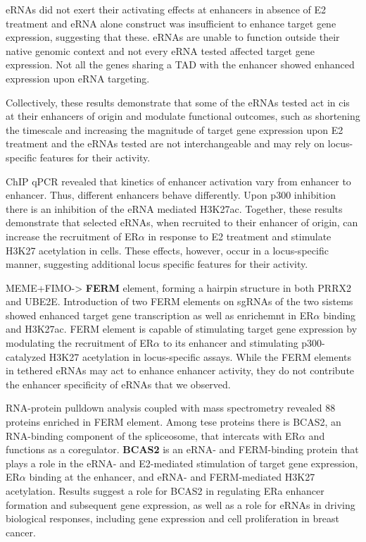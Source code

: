 eRNAs did not exert their activating effects at enhancers in absence of E2 treatment and eRNA alone construct was insufficient to enhance target gene expression, suggesting that these.
eRNAs are unable to function outside their native genomic context and not every eRNA tested affected target gene expression.
Not all the genes sharing a TAD with the enhancer showed enhanced expression upon eRNA
targeting.

Collectively, these results demonstrate that some of the eRNAs tested act in cis at their enhancers of origin and
modulate functional outcomes, such as shortening the timescale
and increasing the magnitude of target gene expression upon E2
treatment and the eRNAs tested are not interchangeable and may rely on locus-
specific features for their activity.

ChIP qPCR revealed that kinetics of enhancer
activation vary from enhancer to
enhancer. Thus, different enhancers
behave differently. Upon p300 inhibition there is an inhibition of the eRNA mediated H3K27ac.
Together, these results demonstrate that selected eRNAs, when
recruited to their enhancer of origin, can increase the recruitment of
ER$\alpha$ in response to E2 treatment and stimulate H3K27 acetylation in
cells. These effects, however, occur in a locus-specific manner,
suggesting additional locus specific features for their activity.

MEME+FIMO-> \textbf{FERM} element, forming a hairpin structure in both PRRX2 and UBE2E. Introduction of two FERM elements on
sgRNAs of the two sistems showed enhanced target gene transcription as well as enrichemnt in ER$\alpha$ binding and H3K27ac.
FERM element is capable of stimulating target gene expression by
modulating the recruitment of ER$\alpha$ to its enhancer and stimulating
p300- catalyzed H3K27 acetylation in locus-specific assays.
While the FERM elements in tethered eRNAs may act to enhance
enhancer activity, they do not contribute the enhancer specificity of
eRNAs that we observed.

RNA-protein pulldown analysis coupled with mass spectrometry revealed 88 proteins enriched in
FERM element. Among tese proteins there is BCAS2, an RNA-binding component of the spliceosome, that
intercats with ER$\alpha$ and functions as a coregulator. \textbf{BCAS2} is an eRNA- and FERM-binding protein that plays a role in the eRNA- and
E2-mediated stimulation of target gene expression, ER$\alpha$ binding at the
enhancer, and eRNA- and FERM-mediated H3K27 acetylation.  Results suggest a role for BCAS2 in regulating ERa enhancer formation and subsequent gene expression, as well as a role for eRNAs in driving biological responses, including gene expression and
cell proliferation in breast cancer.


